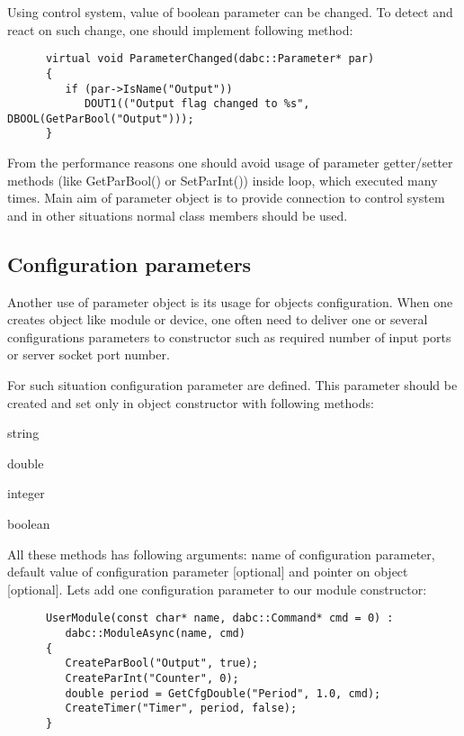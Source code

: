 Using control system, value of boolean parameter can be changed. To detect and react on such change,
one should implement following method: 
 
\begin{verbatim}
      virtual void ParameterChanged(dabc::Parameter* par) 
      {
         if (par->IsName("Output")) 
            DOUT1(("Output flag changed to %s", DBOOL(GetParBool("Output")));
      }
\end{verbatim}

From the performance reasons one should avoid usage of parameter getter/setter methods (like  
GetParBool() or SetParInt()) inside loop, which executed many times. Main aim of parameter
object is to provide connection to control system and in other situations normal class members should be used.


\subsection{Configuration parameters}

Another use of parameter object is its usage for objects configuration.
When one creates object like module or device, one often need to deliver 
one or several configurations parameters to constructor such as required
number of input ports or server socket port number. 

For such situation configuration parameter are defined.
This parameter should be created and set only in object constructor with following methods:
\bdes
\item[GetCfgStr]  string
\item[GetCfgDouble]   double 
\item[GetCfgInt]   integer
\item[GetCfgBool]   boolean 
\edes

All these methods has following arguments: name of configuration parameter, 
default value of configuration parameter [optional] and pointer on  object [optional].
Lets add one configuration parameter to our module constructor:

\begin{verbatim}
      UserModule(const char* name, dabc::Command* cmd = 0) : 
         dabc::ModuleAsync(name, cmd)
      {
         CreateParBool("Output", true);
         CreateParInt("Counter", 0);
         double period = GetCfgDouble("Period", 1.0, cmd);
         CreateTimer("Timer", period, false);
      }
\end{verbatim}

